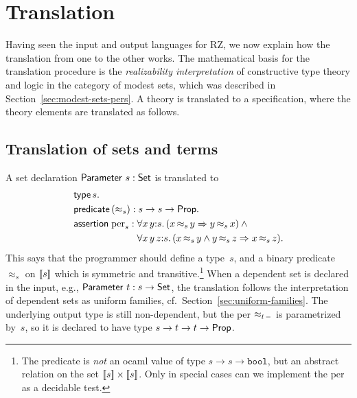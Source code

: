 \section{Translation}
\label{sec:translation}

Having seen the input and output languages for RZ, we now explain how
the translation from one to the other works. The mathematical basis
for the translation procedure is the \emph{realizability
  interpretation} of constructive type theory and logic in the
category of modest sets, which was described in
Section~\ref{sec:modest-sets-pers}. A theory is translated to a
specification, where the theory elements are translated as follows.


\subsection{Translation of sets and terms}
\label{sec:transl-sets-terms}


A set declaration $\mathsf{Parameter}\ s : \mathsf{Set}$ is translated to
%
\begin{align*}
  & \otyspec{s}. \\
  & \opropspec{({\approx_{s}})}{\oarrow{s}{\oarrow{s}{\oProp}}}.\\
  & \oassertion{\mathrm{per}_{s}}{
    \begin{aligned}[t]
      & \oforall{x\,y}{s}{(\oimply{\oper{s}{x}{y}}{\oper{s}{y}{x}})}
        \land {} \\
      & \oforall{x\,y\,z}{s}{(
        \oimply{
          \oper{s}{x}{y} \land \oper{s}{y}{z}
          }{\oper{s}{x}{z}}
        )}.
    \end{aligned}
  }
\end{align*}
%
This says that the programmer should define a type~$s$, and a binary
predicate~$\approx_s$ on $[\![s]\!]$ which is symmetric and
transitive.\footnote{The predicate is \emph{not} an ocaml value of
  type $s \to s \to \mathtt{bool}$, but an abstract relation on the
  set $[\![s]\!] \times [\![s]\!]$. Only in special cases can we
  implement the per as a decidable test.} When a dependent set is
declared in the input, e.g., $\mathsf{Parameter}\ t : s \to \mathsf{Set}$, the
translation follows the interpretation of dependent sets as uniform
families, cf.\ Section~\ref{sec:uniform-families}. The underlying
output type is still non-dependent, but the per
$\approx_{t\,{-}}$ is parametrized by~$s$, so it is declared to
have type $s \to t \to t \to \mathsf{Prop}$.

